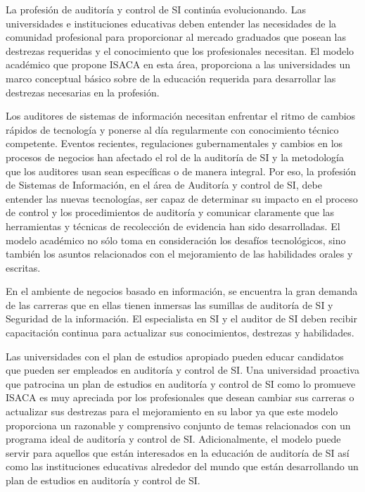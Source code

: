 \begin{syllabus}


\begin{justification}
La profesión de auditoría y control de SI continúa evolucionando. Las universidades e
instituciones educativas deben entender las necesidades de la comunidad profesional
para proporcionar al mercado graduados que posean las destrezas requeridas y el
conocimiento que los profesionales necesitan. El modelo académico que propone
ISACA en esta área, proporciona a las universidades un marco conceptual básico
sobre de la educación requerida para desarrollar las destrezas necesarias en la
profesión.

Los auditores de sistemas de información necesitan enfrentar el ritmo de cambios
rápidos de tecnología y ponerse al día regularmente con conocimiento técnico
competente. Eventos recientes, regulaciones gubernamentales y cambios en los
procesos de negocios han afectado el rol de la auditoría de SI y la metodología que los
auditores usan sean específicas o de manera integral. Por eso, la profesión de
Sistemas de Información, en el área de Auditoría y control de SI, debe entender las
nuevas tecnologías, ser capaz de determinar su impacto en el proceso de control y los
procedimientos de auditoría y comunicar claramente que las herramientas y técnicas
de recolección de evidencia han sido desarrolladas. El modelo académico no sólo
toma en consideración los desafíos tecnológicos, sino también los asuntos
relacionados con el mejoramiento de las habilidades orales y escritas.

En el ambiente de negocios basado en información, se encuentra la gran demanda de
las carreras que en ellas tienen inmersas las sumillas de auditoría de SI y Seguridad
de la información. El especialista en SI y el auditor de SI deben recibir capacitación
continua para actualizar sus conocimientos, destrezas y habilidades.

Las universidades con el plan de estudios apropiado pueden educar candidatos que
pueden ser empleados en auditoría y control de SI. Una universidad proactiva que
patrocina un plan de estudios en auditoría y control de SI como lo promueve ISACA es
muy apreciada por los profesionales que desean cambiar sus carreras o actualizar sus
destrezas para el mejoramiento en su labor ya que este modelo proporciona un
razonable y comprensivo conjunto de temas relacionados con un programa ideal de
auditoría y control de SI. Adicionalmente, el modelo puede servir para aquellos que
están interesados en la educación de auditoría de SI así como las instituciones
educativas alrededor del mundo que están desarrollando un plan de estudios en
auditoría y control de SI.
\end{justification}


\end{syllabus}
